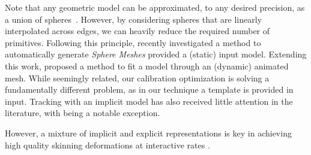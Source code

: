 Note that any geometric model can be approximated, to any desired precision, as a union of spheres~\cite{tagliasacchi2016skeletons}. 
However, by considering spheres that are linearly interpolated across edges, we can heavily reduce the required number of primitives. Following this principle, \cite{thiery2013sphere} recently investigated a method to automatically generate \emph{Sphere Meshes} provided a  (static) input model. Extending this work, \cite{thiery2016spheremesh} proposed a method to fit a model through an (dynamic) animated mesh. While seemingly related, our calibration optimization is solving a fundamentally different problem, as in our technique a template is provided in input. 
Tracking with an implicit model has also received little attention in the literature, with \cite{fua2003soft} being a notable exception. 

However, a mixture of implicit and explicit representations is key in achieving high quality skinning deformations at interactive rates \cite{vaillant2013implicit,vaillant2014robust}.

\endinput




